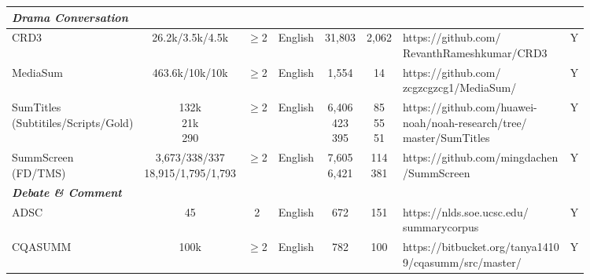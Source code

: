 \begin{table}[th]
\begin{tabular}{|l|c|c|c|c|c|p{4cm}|c|}
			\hline
			\multicolumn{6}{|l|}{\bf \em{Drama Conversation}} \\
			\hline
			CRD3\cite{rameshkumar2020storytelling} &	26.2k/3.5k/4.5k %
			& $\geq$2 & English & 31,803 & 2,062 & \tabincell{l}{https://github.com/\\RevanthRameshkumar/CRD3}& Y \\
			\hline
			MediaSum\cite{zhu2021mediasum} &
			463.6k/10k/10k %
			& $\geq$2 & English & 1,554 & 14 & \tabincell{l}{https://github.com/\\zcgzcgzcg1/MediaSum/}& Y \\
			\hline
			\makecell[l]{SumTitles\cite{malykh2020sumtitles}\\(Subtitiles/Scripts/Gold)} & \makecell[c]{132k\\21k\\290}%
			& $\geq$2 & English & \makecell[c]{6,406\\423\\395} & \makecell[c]{85\\55\\51} & \tabincell{l}{https://github.com/huawei-\\noah/noah-research/tree/\\master/SumTitles}& Y \\
			\hline
			\makecell[l]{SummScreen\cite{chen2021summscreen}\\(FD/TMS)} &\makecell[c]{3,673/338/337\\18,915/1,795/1,793} %
			& $\geq$2 & English & \makecell[c]{7,605\\6,421} & \makecell[c]{114\\381} & \tabincell{l}{https://github.com/mingdachen\\/SummScreen}& Y \\
			\hline
			\multicolumn{6}{|l|}{\bf \em{Debate \& Comment}} \\
			\hline
			ADSC\cite{misra2015using} & 45 & 2 & English & 672 & 151 &\tabincell{l}{https://nlds.soe.ucsc.edu/\\summarycorpus}& Y \\
			\hline
			CQASUMM\cite{chowdhury2019cqasumm} & 100k
			& $\geq$2 & English& 782 & 100 &\tabincell{l}{https://bitbucket.org/tanya1410\\9/cqasumm/src/master/} & Y\\
			

\end{tabular}
\end{table}
